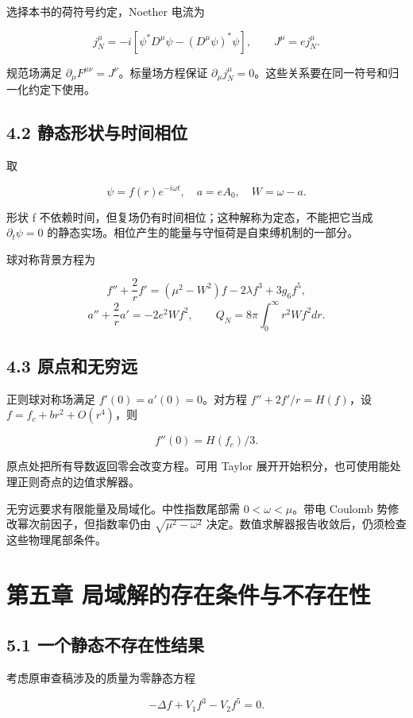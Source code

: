 \documentclass[UTF8,fontset=fandol,11pt]{ctexart}
\begin{document}
选择本书的荷符号约定，Noether 电流为

\[
j_N^\mu=-i[\psi^*D^\mu\psi-(D^\mu\psi)^*\psi],
\qquad J^\mu=e j_N^\mu.
\tag{4.2}
\]

规范场满足 \(\partial_\mu F^{\mu\nu}=J^\nu\)。标量场方程保证 \(\partial_\mu j_N^\mu=0\)。这些关系要在同一符号和归一化约定下使用。

\subsection*{4.2 静态形状与时间相位}

取

\[
\psi=f(r)e^{-i\omega t},\quad a=eA_0,\quad W=\omega-a.
\tag{4.3}
\]

形状 f 不依赖时间，但复场仍有时间相位；这种解称为定态，不能把它当成 \(\partial_t\psi=0\) 的静态实场。相位产生的能量与守恒荷是自束缚机制的一部分。

球对称背景方程为

\[
f''+\frac2rf'=(\mu^2-W^2)f-2\lambda f^3+3g_6f^5,
\tag{4.4}
\]
\[
a''+\frac2ra'=-2e^2Wf^2,
\qquad Q_N=8\pi\int_0^\infty r^2Wf^2dr.
\tag{4.5}
\]

\subsection*{4.3 原点和无穷远}

正则球对称场满足 \(f'(0)=a'(0)=0\)。对方程 \(f''+2f'/r=H(f)\)，设 \(f=f_c+br^2+O(r^4)\)，则

\[
f''(0)=H(f_c)/3.
\tag{4.6}
\]

原点处把所有导数返回零会改变方程。可用 Taylor 展开开始积分，也可使用能处理正则奇点的边值求解器。

无穷远要求有限能量及局域化。中性指数尾部需 \(0<\omega<\mu\)。带电 Coulomb 势修改幂次前因子，但指数率仍由 \(\sqrt{\mu^2-\omega^2}\) 决定。数值求解器报告收敛后，仍须检查这些物理尾部条件。

\section*{第五章 局域解的存在条件与不存在性}

\subsection*{5.1 一个静态不存在性结果}

考虑原审查稿涉及的质量为零静态方程

\[
-\Delta f+V_1f^3-V_2f^5=0.
\tag{5.1}
\]
\end{document}

